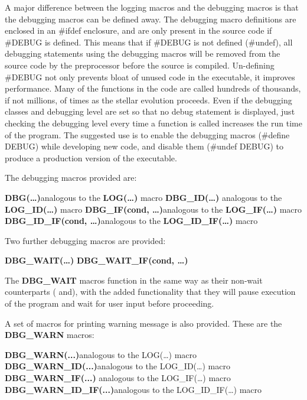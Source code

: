 A major difference between the logging macros and the debugging macros is that the debugging macros can be defined away.  The debugging macro definitions are enclosed in an \#ifdef enclosure, and are only present  in the source code if \#DEBUG is defined.  This means that if \#DEBUG is not defined (\#undef), all debugging statements using the debugging macros will be removed from the source code by the preprocessor before the source is compiled.  Un-defining \#DEBUG not only prevents bloat of unused code in the executable, it improves performance.  Many of the functions in the code are called hundreds of thousands, if not millions, of times as the stellar evolution proceeds.  Even if the debugging classes and debugging level are set so that no debug statement is displayed, just checking the debugging level every time a function is called increases the run time of the program.  The suggested use is to enable the debugging macros (\#define DEBUG) while developing new code, and disable them (\#undef DEBUG) to produce a production version of the executable.

The debugging macros provided are:

\tabto{3em}\textbf{DBG({\dots})}\tabto{14em}analogous to the \textbf{LOG({\dots})} macro
\tabto{3em}\textbf{DBG\_ID({\dots}) }\tabto{14em}analogous to the \textbf{LOG\_ID({\dots})} macro
\tabto{3em}\textbf{DBG\_IF(cond, {\dots})}\tabto{14em}analogous to the \textbf{LOG\_IF({\dots})} macro
\tabto{3em}\textbf{DBG\_ID\_IF(cond, {\dots})}\tabto{14em}analogous to the \textbf{LOG\_ID\_IF({\dots})} macro

\medskip
Two further debugging macros are provided:

\tabto{3em}\textbf{DBG\_WAIT({\dots})}
\tabto{3em}\textbf{DBG\_WAIT\_IF(cond, {\dots})}

\medskip
The \textbf{DBG\_WAIT} macros function in the same way as their non-wait counterparts ( and\linebreak {}), with the added functionality that they will pause execution of the program and wait for user input before proceeding.

\medskip
A set of macros for printing warning message is also provided.  These are the \textbf{DBG\_WARN} macros:

\tabto{3em}\textbf{DBG\_WARN(...)}\tabto{14em}analogous to the LOG({\dots}) macro
\tabto{3em}\textbf{DBG\_WARN\_ID(...)}\tabto{14em}analogous to the LOG\_ID({\dots}) macro
\tabto{3em}\textbf{DBG\_WARN\_IF(...) }\tabto{14em}analogous to the LOG\_IF({\dots}) macro
\tabto{3em}\textbf{DBG\_WARN\_ID\_IF(...)}\tabto{14em}analogous to the LOG\_ID\_IF({\dots}) macro


